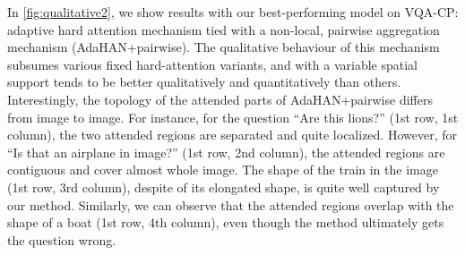 In \autoref{fig:qualitative2}, we show results with our best-performing model on VQA-CP: adaptive hard attention mechanism tied with a non-local, pairwise aggregation mechanism (AdaHAN+pairwise). The qualitative behaviour of this mechanism subsumes various fixed hard-attention variants, and with a variable spatial support tends to be better qualitatively and quantitatively than others. 
Interestingly, the topology of the attended parts of AdaHAN+pairwise differs from image to image. For instance, for the question ``Are this lions?'' (1st row, 1st column), the two attended regions are separated and quite localized.  However, for ``Is that an airplane in image?'' (1st row, 2nd column), the attended regions are contiguous and cover almost whole image.  The shape of the train in the image (1st row, 3rd column), despite of its elongated shape, is quite well captured by our method.  Similarly, we can observe that the attended regions overlap with the shape of a boat (1st row, 4th column), even though the method ultimately gets the question wrong.



